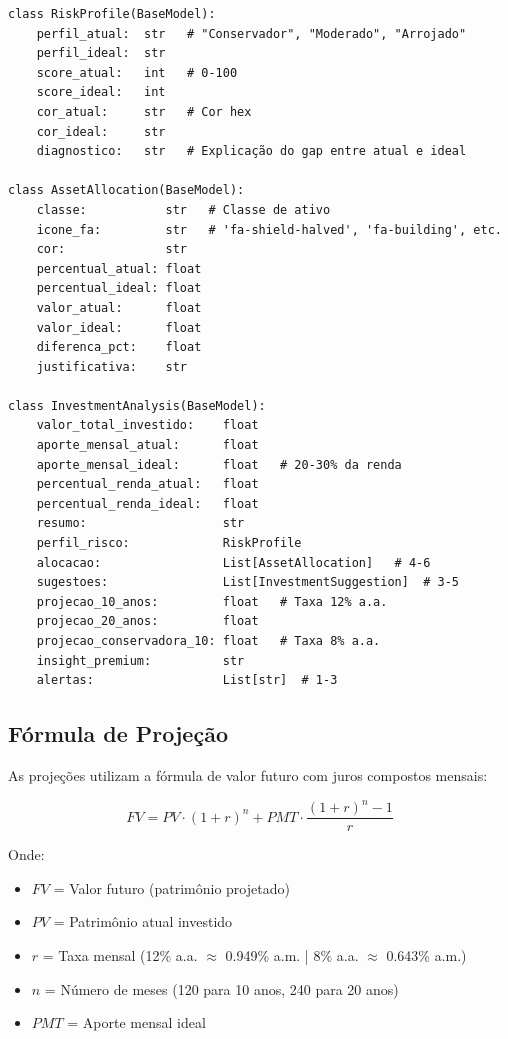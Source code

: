 \documentclass[12pt, a4paper, oneside]{report}
\begin{document}
\begin{lstlisting}[style=python, caption={finance/investment\_assistant.py — Modelos principais}]
class RiskProfile(BaseModel):
    perfil_atual:  str   # "Conservador", "Moderado", "Arrojado"
    perfil_ideal:  str
    score_atual:   int   # 0-100
    score_ideal:   int
    cor_atual:     str   # Cor hex
    cor_ideal:     str
    diagnostico:   str   # Explicação do gap entre atual e ideal

class AssetAllocation(BaseModel):
    classe:           str   # Classe de ativo
    icone_fa:         str   # 'fa-shield-halved', 'fa-building', etc.
    cor:              str
    percentual_atual: float
    percentual_ideal: float
    valor_atual:      float
    valor_ideal:      float
    diferenca_pct:    float
    justificativa:    str

class InvestmentAnalysis(BaseModel):
    valor_total_investido:    float
    aporte_mensal_atual:      float
    aporte_mensal_ideal:      float   # 20-30% da renda
    percentual_renda_atual:   float
    percentual_renda_ideal:   float
    resumo:                   str
    perfil_risco:             RiskProfile
    alocacao:                 List[AssetAllocation]   # 4-6
    sugestoes:                List[InvestmentSuggestion]  # 3-5
    projecao_10_anos:         float   # Taxa 12% a.a.
    projecao_20_anos:         float
    projecao_conservadora_10: float   # Taxa 8% a.a.
    insight_premium:          str
    alertas:                  List[str]  # 1-3
\end{lstlisting}

\subsection{Fórmula de Projeção}

As projeções utilizam a fórmula de valor futuro com juros compostos mensais:

\begin{equation}
FV = PV \cdot (1 + r)^n + PMT \cdot \frac{(1 + r)^n - 1}{r}
\end{equation}

Onde:
\begin{itemize}
  \item $FV$ = Valor futuro (patrimônio projetado)
  \item $PV$ = Patrimônio atual investido
  \item $r$ = Taxa mensal (12\% a.a. $\approx$ 0.949\% a.m. | 8\% a.a. $\approx$ 0.643\% a.m.)
  \item $n$ = Número de meses (120 para 10 anos, 240 para 20 anos)
  \item $PMT$ = Aporte mensal ideal
\end{itemize}
\end{document}
